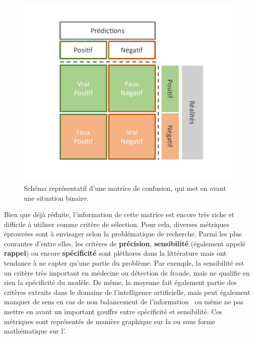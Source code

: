 \begin{figure}[H]
    \centering
    \includegraphics[width=\linewidth]{contents/chapter_3/resources/scheme_confusion_matrix.pdf}
    \caption{Schéma représentatif d’une matrice de confusion, qui met en avant une situation binaire.}
    \label{fig:scheme_confusion_matrix}
\end{figure}

Bien que déjà réduite, l'information de cette matrice est encore très riche et difficile à utiliser comme critère de sélection. Pour cela, diverses métriques éprouvées sont à envisager selon la problématique de recherche. Parmi les plus courantes d'entre elles, les critères de \textbf{précision}, \textbf{sensibilité} (également appelé \textbf{rappel}) ou encore \textbf{spécificité} sont pléthores dans la littérature mais ont tendance à ne capter qu'une partie du problème. Par exemple, la sensibilité est un critère très important en médecine ou détection de fraude, mais ne qualifie en rien la spécificité du modèle. De même, la moyenne fait également partie des critères extraits dans le domaine de l'intelligence artificielle, mais peut également manquer de sens en cas de non balancement de l'information~\cite{Guo2008} ou même ne pas mettre en avant un important gouffre entre spécificité et sensibilité. Ces métriques sont représentés de manière graphique sur la  ou sous forme mathématique sur l'.\par

